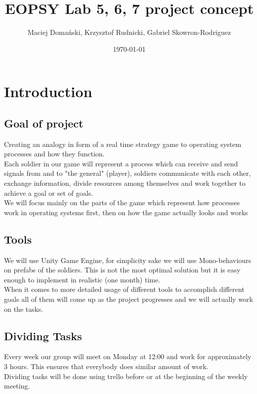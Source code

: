 \documentclass{article}
\title{EOPSY Lab 5, 6, 7 project concept}
\author{Maciej Domański, Krzysztof Rudnicki, Gabriel Skowron-Rodriguez}
\date{\today}
\begin{document}
\maketitle

\section{Introduction}

\subsection{Goal of project}
Creating an analogy in form of a real time strategy game to operating system processes and how they function. \\
Each soldier in our game will represent a process which can receive and send signals from and to "the general" (player), soldiers communicate with each other, exchange information, divide resources among themselves and work together to achieve a goal or set of goals. \\
We will focus mainly on the parts of the game which represent how processes work in operating systems first, then on how the game actually looks and works

\subsection{Tools}
We will use Unity Game Engine, for simplicity sake we will use Mono-behaviours on prefabs of the soldiers. This is not the most optimal solution but it is easy enough to implement in realistic (one month) time. \\
When it comes to more detailed usage of different tools to accomplish different goals all of them will come up as the project progresses and we will actually work on the tasks.

\subsection{Dividing Tasks}
Every week our group will meet on Monday at 12:00 and work for approximately 3 hours. This ensures that everybody does similar amount of work. \\
Dividing tasks will be done using trello before or at the beginning of the weekly meeting.

\newpage
\end{document}
